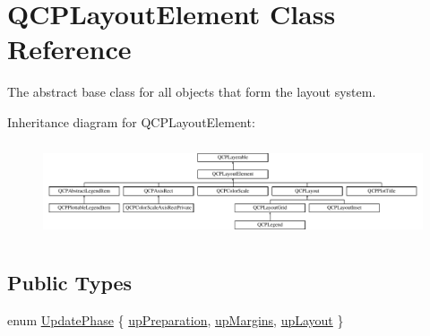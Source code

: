 \hypertarget{classQCPLayoutElement}{\section{\-Q\-C\-P\-Layout\-Element \-Class \-Reference}
\label{classQCPLayoutElement}
}


\-The abstract base class for all objects that form the layout system.  


\-Inheritance diagram for \-Q\-C\-P\-Layout\-Element\-:\begin{figure}[H]
\begin{center}
\leavevmode
\includegraphics[height=2.814070cm]{classQCPLayoutElement}
\end{center}
\end{figure}
\subsection*{\-Public \-Types}
\begin{DoxyCompactItemize}
\item 
enum \hyperlink{classQCPLayoutElement_a0d83360e05735735aaf6d7983c56374d}{\-Update\-Phase} \{ \hyperlink{classQCPLayoutElement_a0d83360e05735735aaf6d7983c56374dad6119882eba136357c2f627992e527d3}{up\-Preparation}, 
\hyperlink{classQCPLayoutElement_a0d83360e05735735aaf6d7983c56374da288cb59a92280e47261a341f2813e676}{up\-Margins}, 
\hyperlink{classQCPLayoutElement_a0d83360e05735735aaf6d7983c56374da5d1ccf5d79967c232c3c511796860045}{up\-Layout}
 \}
\end{DoxyCompactItemize}
